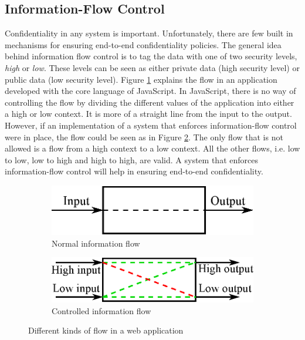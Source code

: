 \subsection{Information-Flow Control}
Confidentiality in any system is important. Unfortunately, there are few built in mechanisms for ensuring end-to-end confidentiality policies.\cite{ifc-jsac} The general idea behind information flow control is to tag the data with one of two security levels, \emph{high} or \emph{low}. These levels can be seen as either private data (high security level) or public data (low security level). Figure \ref{fig:normal_flow} explains the flow in an application developed with the core language of JavaScript. In JavaScript, there is no way of controlling the flow by dividing the different values of the application into either a high or low context. It is more of a straight line from the input to the output. However, if an implementation of a system that enforces information-flow control were in place, the flow could be seen as in Figure \ref{fig:controlled_flow}. The only flow that is not allowed is a flow from a high context to a low context. All the other flows, i.e. low to low, low to high and high to high, are valid. A system that enforces information-flow control will help in ensuring end-to-end confidentiality.
\begin{figure}[h]
  \begin{subfigure}{.5\textwidth}
    \includegraphics[scale=0.65]{images/flow_normal.eps}
    \caption{Normal information flow}
    \label{fig:normal_flow}
  \end{subfigure}
  \begin{subfigure}{.5\textwidth}
    \includegraphics[scale=0.65]{images/flow_controlled.eps}
    \caption{Controlled information flow}
    \label{fig:controlled_flow}
  \end{subfigure}
  \caption{Different kinds of flow in a web application}
  \label{fig:flows}
\end{figure}
